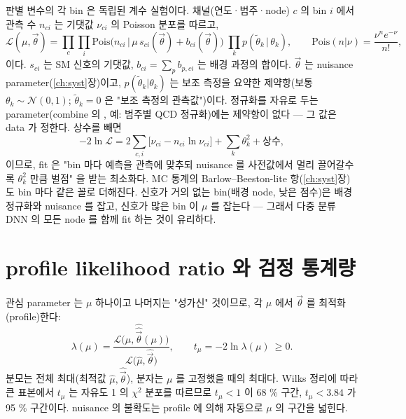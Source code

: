 판별 변수의 각 bin 은 독립된 계수 실험이다. 채널(연도·범주·node) $c$ 의 bin $i$ 에서 관측 수 $n_{ci}$ 는 기댓값 $\nu_{ci}$ 의 Poisson 분포를 따르고,
\begin{equation}
  \mathcal{L}(\mu,\vec\theta)=\prod_{c}\prod_{i}\mathrm{Pois}\bigl(n_{ci}\,\big|\,\mu\,s_{ci}(\vec\theta)+b_{ci}(\vec\theta)\bigr)\;
  \prod_{k}p(\tilde\theta_k\,|\,\theta_k),\qquad
  \mathrm{Pois}(n|\nu)=\frac{\nu^{n}e^{-\nu}}{n!},
  \label{eq:stats-L}
\end{equation}
이다. $s_{ci}$ 는 SM 신호의 기댓값, $b_{ci}=\sum_p b_{p,ci}$ 는 배경 과정의 합이다. $\vec\theta$ 는 nuisance parameter(\ref{ch:syst}장)이고,
$p(\tilde\theta_k|\theta_k)$ 는 보조 측정을 요약한 제약항(보통 $\theta_k\sim\mathcal{N}(0,1)$; $\tilde\theta_k=0$ 은 "보조 측정의 관측값")이다.
정규화를 자유로 두는 parameter(combine 의 , 예: 범주별 QCD 정규화)에는 제약항이 없다 — 그 값은 data 가 정한다. 상수를 빼면
\begin{equation}
  -2\ln\mathcal{L}=2\sum_{c,i}\bigl[\nu_{ci}-n_{ci}\ln\nu_{ci}\bigr]+\sum_k\theta_k^2+\text{상수},
  \label{eq:stats-nll}
\end{equation}
이므로, fit 은 "bin 마다 예측을 관측에 맞추되 nuisance 를 사전값에서 멀리 끌어갈수록 $\theta_k^2$ 만큼 벌점" 을 받는 최소화다. MC 통계의 Barlow–Beeston-lite
항(\ref{ch:syst}장)도 bin 마다 같은 꼴로 더해진다. 신호가 거의 없는 bin(배경 node, 낮은 점수)은 배경 정규화와 nuisance 를 잡고, 신호가 많은 bin 이 $\mu$ 를
잡는다 — 그래서 다중 분류 DNN 의 모든 node 를 함께 fit 하는 것이 유리하다.

\section{profile likelihood ratio 와 검정 통계량}\label{sec:stats-plr}

관심 parameter 는 $\mu$ 하나이고 나머지는 "성가신" 것이므로, 각 $\mu$ 에서 $\vec\theta$ 를 최적화(profile)한다:
\begin{equation}
  \lambda(\mu)=\frac{\mathcal{L}\bigl(\mu,\hat{\hat{\vec\theta}}(\mu)\bigr)}{\mathcal{L}\bigl(\hat\mu,\hat{\vec\theta}\bigr)},\qquad
  t_\mu=-2\ln\lambda(\mu)\ \ge 0 .
  \label{eq:stats-plr}
\end{equation}
분모는 전체 최대(최적값 $\hat\mu,\hat{\vec\theta}$), 분자는 $\mu$ 를 고정했을 때의 최대다. Wilks 정리에 따라 큰 표본에서 $t_\mu$ 는 자유도 1 의 $\chi^2$
분포를 따르므로 $t_\mu<1$ 이 68 \% 구간, $t_\mu<3.84$ 가 95 \% 구간이다. nuisance 의 불확도는 profile 에 의해 자동으로 $\mu$ 의 구간을 넓힌다.

